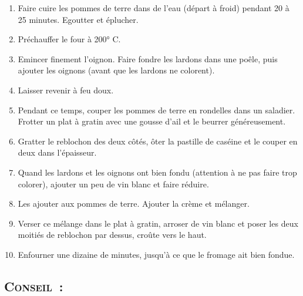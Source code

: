 \begin{enumerate}
\item Faire cuire les pommes de terre dans de l'eau (d\'epart \`a froid) pendant 20 \`a 25 minutes. Egoutter et \'eplucher.
\item Pr\'echauffer le four \`a 200° C.
\item Emincer finement l'oignon. Faire fondre les lardons dans une po\^ele, puis ajouter les oignons (avant que les lardons ne colorent). 
\item Laisser revenir \`a feu doux.
\item Pendant ce temps, couper les pommes de terre en rondelles dans un saladier. Frotter un plat \`a gratin avec une gousse d'ail et le beurrer g\'en\'ereusement. 
\item Gratter le reblochon des deux côt\'es, ôter la pastille de cas\'eine et le couper en deux dans l'\'epaisseur.
\item Quand les lardons et les oignons ont bien fondu (attention \`a ne pas faire trop colorer), ajouter un peu de vin blanc et faire r\'eduire. 
\item Les ajouter aux pommes de terre. Ajouter la cr\`eme et m\'elanger.
\item Verser ce m\'elange dans le plat \`a gratin, arroser de vin blanc et poser les deux moiti\'es de reblochon par dessus, croûte vers le haut.
\item Enfourner une dizaine de minutes, jusqu'\`a ce que le fromage ait bien fondue.
\end{enumerate}
\subsection*{\textsc{Conseil~:}}

